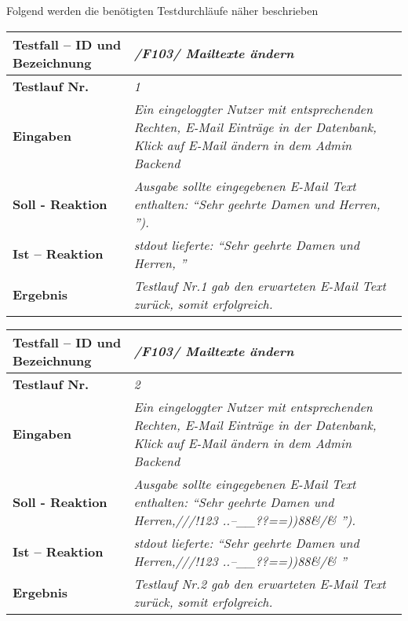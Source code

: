 Folgend werden die benötigten Testdurchläufe näher beschrieben
\begin{longtable}{|p{5cm}|p{10cm}|}
\hline
\textbf{Testfall -- ID und Bezeichnung} & \textit{/F103/ Mailtexte ändern} \\
\hline
\textbf{Testlauf Nr.} & \textit{1} \\
\hline
\textbf{Eingaben} & \textit{Ein eingeloggter Nutzer mit entsprechenden Rechten, E-Mail 
Einträge in der Datenbank, Klick auf E-Mail ändern in dem Admin Backend } \\
\hline
\textbf{Soll - Reaktion} & \textit{Ausgabe sollte eingegebenen E-Mail
Text enthalten: "`Sehr geehrte Damen und Herren, "').
} \\
\hline
\textbf{Ist -- Reaktion} & \textit{stdout lieferte: "`Sehr geehrte Damen und Herren, "'} \\
\hline
\textbf{Ergebnis} & \textit{Testlauf Nr.1 gab den erwarteten E-Mail Text zurück, somit erfolgreich.} \\
\hline
 \end{longtable}
 
\begin{longtable}{|p{5cm}|p{10cm}|}
\hline
\textbf{Testfall -- ID und Bezeichnung} & \textit{/F103/ Mailtexte ändern} \\
\hline
\textbf{Testlauf Nr.} & \textit{2} \\
\hline
\textbf{Eingaben} & \textit{Ein eingeloggter Nutzer mit entsprechenden Rechten, E-Mail 
Einträge in der Datenbank, Klick auf E-Mail ändern in dem Admin Backend } \\
\hline
\textbf{Soll - Reaktion} & \textit{Ausgabe sollte eingegebenen E-Mail
Text enthalten: "`Sehr geehrte Damen und Herren,///!123 
                    ..--\_\_??==))88\&/\& "').
} \\
\hline
\textbf{Ist -- Reaktion} & \textit{stdout lieferte: "`Sehr geehrte Damen und Herren,///!123 
                    ..--\_\_??==))88\&/\& "'} \\
\hline
\textbf{Ergebnis} & \textit{Testlauf Nr.2 gab den erwarteten E-Mail Text zurück, somit erfolgreich.} \\
\hline
 \end{longtable} 
 

